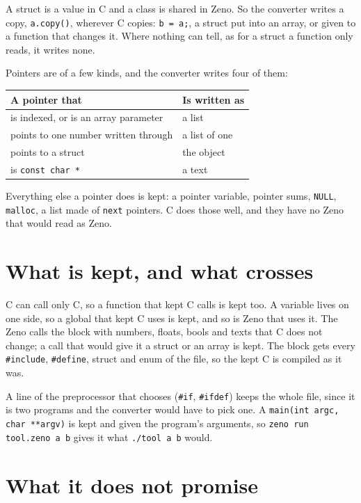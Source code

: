 A struct is a value in C and a class is shared in Zeno. So the
converter writes a copy, \verb|a.copy()|, wherever C copies:
\verb|b = a;|, a struct put into an array, or given to a function that changes
it. Where nothing can tell, as for a struct a function only reads, it
writes none.

Pointers are of a few kinds, and the converter writes four of them:

\begin{center}
\begin{tabular}{lP{7cm}}
\toprule
A pointer that & Is written as \\
\midrule
is indexed, or is an array parameter & a list \\
points to one number written through & a list of one \\
points to a struct & the object \\
is \verb|const char *| & a text \\
\bottomrule
\end{tabular}
\end{center}

Everything else a pointer does is kept: a pointer variable, pointer
sums, \verb|NULL|, \verb|malloc|, a list made of \verb|next| pointers.
C does those well, and they have no Zeno that would read as Zeno.

\section{What is kept, and what crosses}

C can call only C, so a function that kept C calls is kept too. A
variable lives on one side, so a global that kept C uses is kept, and
so is Zeno that uses it. The Zeno calls the block with numbers, floats,
bools and texts that C does not change; a call that would give it a
struct or an array is kept. The block gets every \verb|#include|,
\verb|#define|, struct and enum of the file, so the kept C is compiled
as it was.

A line of the preprocessor that chooses (\verb|#if|, \verb|#ifdef|)
keeps the whole file, since it is two programs and the converter would
have to pick one. A \verb|main(int argc, char **argv)| is kept and
given the program's arguments, so \verb|zeno run tool.zeno a b| gives
it what \verb|./tool a b| would.

\section{What it does not promise}


